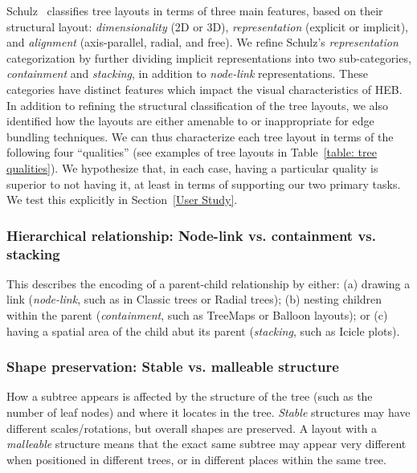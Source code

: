 \documentclass[a4paper]{llncs}
\begin{document}
Schulz~\cite{TreeVisSchulz} classifies tree layouts in terms of three main features, based on their structural layout: \textit{dimensionality} (2D or 3D), \textit{representation} (explicit or implicit), and \textit{alignment} (axis-parallel, radial, and free). We refine Schulz's \textit{representation} categorization by further dividing implicit representations into two sub-categories, \textit{containment} and \textit{stacking}, in addition to \textit{node-link} representations. These categories have distinct features which impact the visual characteristics of HEB. In addition to refining the structural classification of the tree layouts, we also identified how the layouts are either amenable to or inappropriate for edge bundling techniques. We can thus characterize each tree layout in terms of the following four ``qualities'' (see examples of tree layouts in Table~\ref{table: tree qualities}). We hypothesize that, in each case, having a particular quality is superior to not having it, at least in terms of supporting our two primary tasks. We test this explicitly in Section~\ref{User Study}.


\subsubsection*{Hierarchical relationship: Node-link vs. containment vs. stacking} This describes the encoding of a parent-child relationship by either: (a) drawing a link (\textit{node-link}, such as in Classic trees or Radial trees); (b) nesting children within the parent (\textit{containment}, such as TreeMaps or Balloon layouts); or (c) having a spatial area of the child abut its parent (\textit{stacking}, such as Icicle plots). 

\subsubsection*{Shape preservation: Stable vs. malleable structure} How a subtree appears is affected by the structure of the tree (such as the number of leaf nodes) and where it locates in the tree. \textit{Stable} structures may have different scales/rotations, but overall shapes are preserved. A layout with a \textit{malleable} structure means that the exact same subtree may appear very different when positioned in different trees, or in different places within the same tree.
\end{document}
